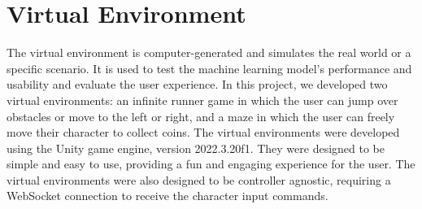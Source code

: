\section{Virtual Environment}
The virtual environment is computer-generated and simulates the real world or a specific scenario.
It is used to test the machine learning model's performance and usability and evaluate the user experience.
In this project, we developed two virtual environments: an infinite runner game in which the user can jump over obstacles or move to the left or right, and a maze in which the user can freely move their character to collect coins.
The virtual environments were developed using the Unity game engine, version 2022.3.20f1. They were designed to be simple and easy to use, providing a fun and engaging experience for the user.
The virtual environments were also designed to be controller agnostic, requiring a WebSocket connection to receive the character input commands.
